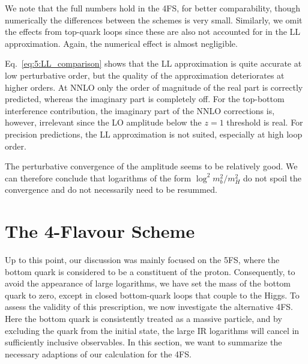 We note that the full numbers hold in the 4\acs{FS}, for better comparability, though numerically the differences between the schemes is very small. Similarly, we omit the effects from top-quark loops since these are also not accounted for in the \acs{LL} approximation. Again, the numerical effect is almost negligible.

Eq.~\eqref{eq:5:LL_comparison} shows that the \acs{LL} approximation is quite accurate at low perturbative order, but the quality of the approximation deteriorates at higher orders. At \acs{NNLO} only the order of magnitude of the real part is correctly predicted, whereas the imaginary part is completely off. For the top-bottom interference contribution, the imaginary part of the \acs{NNLO} corrections is, however, irrelevant since the \acs{LO} amplitude below the $z=1$ threshold is real. For precision predictions, the \acs{LL} approximation is not suited, especially at high loop order.

The perturbative convergence of the amplitude seems to be relatively good. We can therefore conclude that logarithms of the form $\log^2 m_b^2/m_H^2$ do not spoil the convergence and do not necessarily need to be resummed.



\section{The 4-Flavour Scheme}\label{sec:5:4FS}
Up to this point, our discussion was mainly focused on the 5\acs{FS}, where the bottom quark is considered to be a constituent of the proton. Consequently, to avoid the appearance of large logarithms, we have set the mass of the bottom quark to zero, except in closed bottom-quark loops that couple to the Higgs. To assess the validity of this prescription, we now investigate the alternative 4\acs{FS}. Here the bottom quark is consistently treated as a massive particle, and by excluding the quark from the initial state, the large \acs{IR} logarithms will cancel in sufficiently inclusive observables. In this section, we want to summarize the necessary adaptions of our calculation for the 4\acs{FS}.

